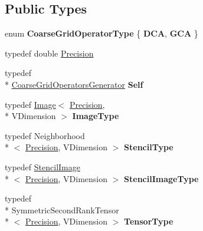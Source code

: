 \subsection*{Public Types}
\begin{DoxyCompactItemize}
\item 
enum {\bfseries Coarse\-Grid\-Operator\-Type} \{ {\bfseries D\-C\-A}, 
{\bfseries G\-C\-A}
 \}
\item 
typedef double \hyperlink{classitk_1_1mad_1_1_coarse_grid_operators_generator_a271e011defd362bc027e771f8efdd693}{Precision}
\item 
\hypertarget{classitk_1_1mad_1_1_coarse_grid_operators_generator_aa651e8f98e66fc2a413dc0c95e392706}{typedef \\*
\hyperlink{classitk_1_1mad_1_1_coarse_grid_operators_generator}{Coarse\-Grid\-Operators\-Generator} {\bfseries Self}}\label{classitk_1_1mad_1_1_coarse_grid_operators_generator_aa651e8f98e66fc2a413dc0c95e392706}

\item 
\hypertarget{classitk_1_1mad_1_1_coarse_grid_operators_generator_a0883143becbb78d20bb9c36361feb7be}{typedef \hyperlink{class_image}{Image}$<$ \hyperlink{classitk_1_1mad_1_1_coarse_grid_operators_generator_a271e011defd362bc027e771f8efdd693}{Precision}, \\*
V\-Dimension $>$ {\bfseries Image\-Type}}\label{classitk_1_1mad_1_1_coarse_grid_operators_generator_a0883143becbb78d20bb9c36361feb7be}

\item 
\hypertarget{classitk_1_1mad_1_1_coarse_grid_operators_generator_a4a13e1358968c511221f8cda2d726947}{typedef Neighborhood\\*
$<$ \hyperlink{classitk_1_1mad_1_1_coarse_grid_operators_generator_a271e011defd362bc027e771f8efdd693}{Precision}, V\-Dimension $>$ {\bfseries Stencil\-Type}}\label{classitk_1_1mad_1_1_coarse_grid_operators_generator_a4a13e1358968c511221f8cda2d726947}

\item 
\hypertarget{classitk_1_1mad_1_1_coarse_grid_operators_generator_a29a783745ad15c41e408afcacdb16095}{typedef \hyperlink{classitk_1_1mad_1_1_stencil_image}{Stencil\-Image}\\*
$<$ \hyperlink{classitk_1_1mad_1_1_coarse_grid_operators_generator_a271e011defd362bc027e771f8efdd693}{Precision}, V\-Dimension $>$ {\bfseries Stencil\-Image\-Type}}\label{classitk_1_1mad_1_1_coarse_grid_operators_generator_a29a783745ad15c41e408afcacdb16095}

\item 
\hypertarget{classitk_1_1mad_1_1_coarse_grid_operators_generator_a86efcf353cc609c9e320f2c37c3f0e6d}{typedef \\*
Symmetric\-Second\-Rank\-Tensor\\*
$<$ \hyperlink{classitk_1_1mad_1_1_coarse_grid_operators_generator_a271e011defd362bc027e771f8efdd693}{Precision}, V\-Dimension $>$ {\bfseries Tensor\-Type}}\label{classitk_1_1mad_1_1_coarse_grid_operators_generator_a86efcf353cc609c9e320f2c37c3f0e6d}


\end{DoxyCompactItemize}
